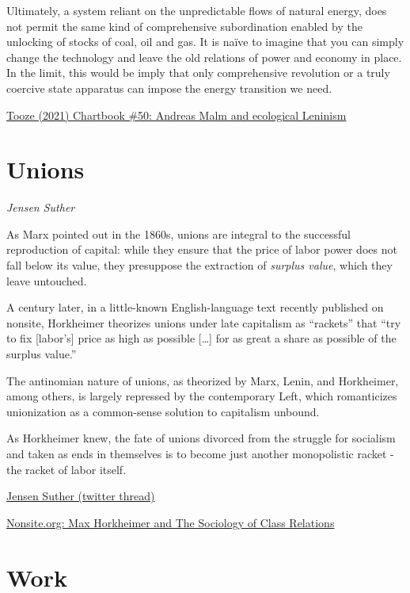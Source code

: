 \documentclass[
]{book}
\begin{document}
Ultimately, a system reliant on the unpredictable flows of natural energy, does not permit the same kind of comprehensive subordination enabled by the unlocking of stocks of coal, oil and gas. It is naïve to imagine that you can simply change the technology and leave the old relations of power and economy in place. In the limit, this would be imply that only comprehensive revolution or a truly coercive state apparatus can impose the energy transition we need.

\href{https://adamtooze.substack.com/p/chartbook-50-andreas-malm-and-ecological}{Tooze (2021) Chartbook \#50: Andreas Malm and ecological Leninism}

\hypertarget{unions}{%
\chapter{Unions}\label{unions}}

\emph{Jensen Suther}

As Marx pointed out in the 1860s, unions are integral to the successful reproduction of capital: while they ensure that the price of labor power does not fall below its value, they presuppose the extraction of \emph{surplus value}, which they leave untouched.

A century later, in a little-known English-language text recently published on nonsite, Horkheimer theorizes unions under late capitalism as ``rackets'' that ``try to fix {[}labor's{]} price as high as possible {[}\ldots{]} for as great a share as possible of the surplus value.''

The antinomian nature of unions, as theorized by Marx, Lenin, and Horkheimer, among others, is largely repressed by the contemporary Left, which romanticizes unionization as a common-sense solution to capitalism unbound.

As Horkheimer knew, the fate of unions divorced from the struggle for socialism and taken as ends in themselves is to become just another monopolistic racket - the racket of labor itself.

\href{https://twitter.com/jensensuther/status/1396925484131184641}{Jensen Suther (twitter thread)}

\href{https://nonsite.org/max-horkheimer-and-the-sociology-of-class-relations/}{Nonsite.org: Max Horkheimer and The Sociology of Class Relations}

\hypertarget{work}{%
\chapter{Work}\label{work}}
\end{document}
